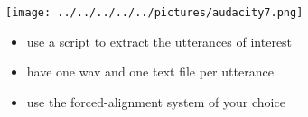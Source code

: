 \documentclass[12pt,a4paper]{beamer}
\begin{document}
\begin{frame}
    \centering
    \texttt{[image: ../../../../../pictures/audacity7.png]}
\end{frame}

\begin{frame}
    \begin{itemize}
        \item use a script to extract the utterances of interest
        \item have one wav and one text file per utterance
        \item use the forced-alignment system of your choice
    \end{itemize}
\end{frame}
\end{document}
